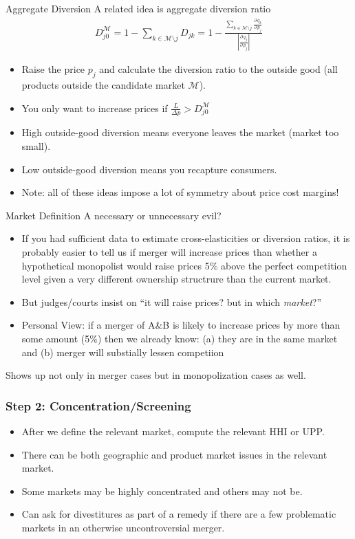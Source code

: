 \documentclass[aspectratio=169,10pt]{beamer}
\begin{document}
\begin{frame}{Aggregate Diversion}
A related idea is \alert{aggregate diversion ratio}
\begin{align*}
D_{j0}^{\mathcal{M}} = 1 - \sum_{k \in \mathcal{M} \setminus j} D_{jk} = 1 - \frac{\sum_{k \in \mathcal{M} \setminus j} \frac{\partial\, q_k}{\partial\, p_j}}{\left|\frac{\partial\, q_j}{\partial\, p_j}\right|}
\end{align*}
\begin{itemize}
    \item Raise the price $p_j$ and calculate the diversion ratio to the outside good (all products outside the candidate market $\mathcal{M}$).
    \item You only want to increase prices if $\frac{L}{ \Delta p} > D_{j0}^{\mathcal{M}}$
    \item High outside-good diversion means everyone leaves the market (market too small).
    \item Low outside-good diversion means you recapture consumers.
    \item Note: all of these ideas impose a lot of symmetry about price cost margins!
\end{itemize}
\end{frame}

\begin{frame}{Market Definition}
A necessary or \alert{unnecessary} evil?
\begin{itemize}
    \item If you had sufficient data to estimate cross-elasticities or diversion ratios, it is probably easier to tell us if \alert{merger will increase prices} than whether a hypothetical monopolist would raise prices 5\% above the perfect competition level given a very different ownership structrure than the current market.
    \item But judges/courts insist on ``it will raise prices? but in which \textit{market}?''
    \item Personal View: if a merger of A\&B is likely to increase prices by more than some amount (5\%) then we already know: (a) they are in the same market and (b) merger will substially lessen competiion
\end{itemize}
Shows up not only in \alert{merger cases} but in \alert{monopolization cases} as well.
\end{frame}




\begin{frame}
\frametitle{Step 2: Concentration/Screening}
 \begin{itemize}
\item After we define the relevant market, compute the relevant HHI or UPP.
\item There can be both geographic and product market issues in the relevant market.
\item Some markets may be highly concentrated and others may not be.
\item Can ask for \alert{divestitures} as part of a \alert{remedy} if there are a few problematic markets in an otherwise uncontroversial merger.
 \end{itemize}
\end{frame}
\end{document}
